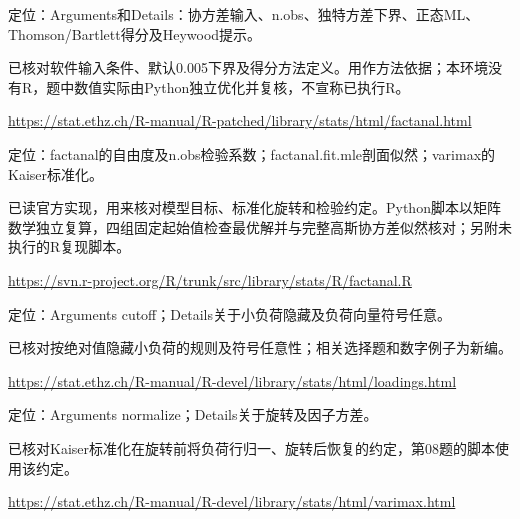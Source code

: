 \par\noindent\begin{minipage}{\linewidth}\label{src:R-FACTANAL}
\par
定位：Arguments和Details：协方差输入、n.obs、独特方差下界、正态ML、Thomson/Bartlett得分及Heywood提示。\par
已核对软件输入条件、默认0.005下界及得分方法定义。用作方法依据；本环境没有R，题中数值实际由Python独立优化并复核，不宣称已执行R。\par
{\small\url{https://stat.ethz.ch/R-manual/R-patched/library/stats/html/factanal.html}}\par
\end{minipage}\par\medskip

\par\noindent\begin{minipage}{\linewidth}\label{src:R-FA-SOURCE}
\par
定位：factanal的自由度及n.obs检验系数；factanal.fit.mle剖面似然；varimax的Kaiser标准化。\par
已读官方实现，用来核对模型目标、标准化旋转和检验约定。Python脚本以矩阵数学独立复算，四组固定起始值检查最优解并与完整高斯协方差似然核对；另附未执行的R复现脚本。\par
{\small\url{https://svn.r-project.org/R/trunk/src/library/stats/R/factanal.R}}\par
\end{minipage}\par\medskip

\par\noindent\begin{minipage}{\linewidth}\label{src:R-LOADINGS}
\par
定位：Arguments cutoff；Details关于小负荷隐藏及负荷向量符号任意。\par
已核对按绝对值隐藏小负荷的规则及符号任意性；相关选择题和数字例子为新编。\par
{\small\url{https://stat.ethz.ch/R-manual/R-devel/library/stats/html/loadings.html}}\par
\end{minipage}\par\medskip

\par\noindent\begin{minipage}{\linewidth}\label{src:R-ROTATION}
\par
定位：Arguments normalize；Details关于旋转及因子方差。\par
已核对Kaiser标准化在旋转前将负荷行归一、旋转后恢复的约定，第08题的脚本使用该约定。\par
{\small\url{https://stat.ethz.ch/R-manual/R-devel/library/stats/html/varimax.html}}\par
\end{minipage}\par\medskip

